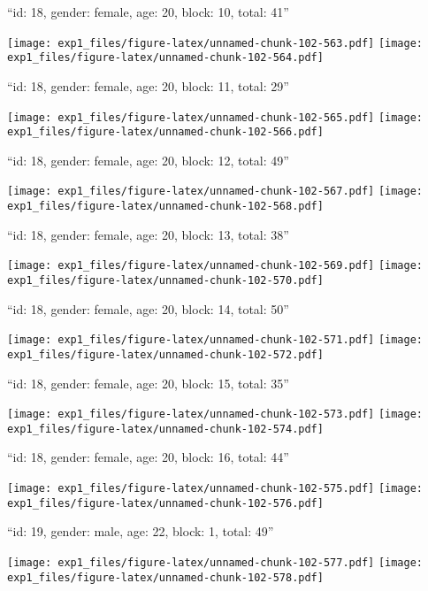 \documentclass[11pt,,]{article}
\begin{document}
\newpage
[1] 

``id: 18, gender: female, age: 20, block: 10, total: 41''

\texttt{[image: exp1\_files/figure-latex/unnamed-chunk-102-563.pdf]}
\texttt{[image: exp1\_files/figure-latex/unnamed-chunk-102-564.pdf]}

\newpage
[1] 

``id: 18, gender: female, age: 20, block: 11, total: 29''

\texttt{[image: exp1\_files/figure-latex/unnamed-chunk-102-565.pdf]}
\texttt{[image: exp1\_files/figure-latex/unnamed-chunk-102-566.pdf]}

\newpage
[1] 

``id: 18, gender: female, age: 20, block: 12, total: 49''

\texttt{[image: exp1\_files/figure-latex/unnamed-chunk-102-567.pdf]}
\texttt{[image: exp1\_files/figure-latex/unnamed-chunk-102-568.pdf]}

\newpage
[1] 

``id: 18, gender: female, age: 20, block: 13, total: 38''

\texttt{[image: exp1\_files/figure-latex/unnamed-chunk-102-569.pdf]}
\texttt{[image: exp1\_files/figure-latex/unnamed-chunk-102-570.pdf]}

\newpage
[1] 

``id: 18, gender: female, age: 20, block: 14, total: 50''

\texttt{[image: exp1\_files/figure-latex/unnamed-chunk-102-571.pdf]}
\texttt{[image: exp1\_files/figure-latex/unnamed-chunk-102-572.pdf]}

\newpage
[1] 

``id: 18, gender: female, age: 20, block: 15, total: 35''

\texttt{[image: exp1\_files/figure-latex/unnamed-chunk-102-573.pdf]}
\texttt{[image: exp1\_files/figure-latex/unnamed-chunk-102-574.pdf]}

\newpage
[1] 

``id: 18, gender: female, age: 20, block: 16, total: 44''

\texttt{[image: exp1\_files/figure-latex/unnamed-chunk-102-575.pdf]}
\texttt{[image: exp1\_files/figure-latex/unnamed-chunk-102-576.pdf]}

\newpage
[1] 

``id: 19, gender: male, age: 22, block: 1, total: 49''

\texttt{[image: exp1\_files/figure-latex/unnamed-chunk-102-577.pdf]}
\texttt{[image: exp1\_files/figure-latex/unnamed-chunk-102-578.pdf]}
\end{document}
